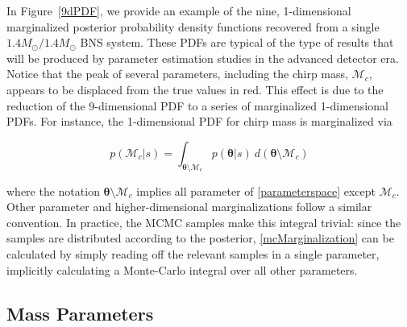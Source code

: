\documentclass[11pt,a4paper]{emulateapj}
\newcommand{\thpara}{\boldsymbol{\theta}}
\newcommand{\chmass}{\mathcal{M}_c}
\begin{document}
In Figure~\ref{9dPDF}, we provide an example of the nine, 1-dimensional marginalized posterior 
probability density functions recovered from a single $1.4M_{\odot}/1.4M_{\odot}$ BNS system. 
 These PDFs are typical of the type of results that will be produced by parameter estimation
  studies in the advanced  detector era.  Notice that the peak of several parameters, including the 
  chirp mass, $\chmass$,  appears to be displaced from the true values in red.  This effect is due to 
  the reduction of the  9-dimensional PDF to a series of marginalized 1-dimensional PDFs. 
   For instance, the 1-dimensional PDF for chirp mass is marginalized via

\begin{equation}
p(\chmass | s) = \int _{\thpara \setminus \chmass} p(\thpara | s)~d(\thpara \setminus \chmass)
\label{mcMarginalization}
\end{equation}

\noindent where the notation $\thpara \setminus \chmass$ implies all
parameter of \eqref{parameterspace} except $\chmass$.  Other parameter and higher-dimensional marginalizations follow
 a similar convention.  In practice, the MCMC samples make this integral trivial: since the samples are distributed according 
to the posterior, \eqref{mcMarginalization} can be calculated by simply reading off the relevant samples in a single parameter, 
implicitly calculating a Monte-Carlo integral over all other parameters.



\subsection{Mass Parameters}
\label{massSection}
\end{document}
